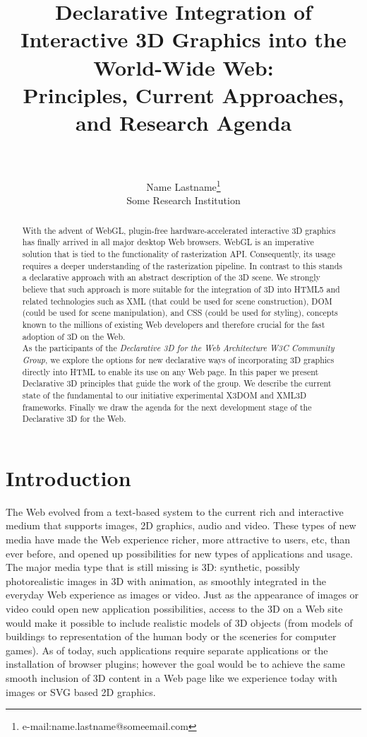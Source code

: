 \documentclass[review]{acmsiggraph}
\title{Declarative Integration of Interactive 3D Graphics into the World-Wide Web:\\Principles, Current Approaches, and Research Agenda
\\~} %
\author{Name Lastname\thanks{e-mail:name.lastname@someemail.com}\\Some Research Institution}
\begin{document}
\maketitle

\begin{abstract}
With the advent of WebGL, plugin-free hardware-accelerated interactive 3D graphics has finally arrived in all major desktop Web browsers.
WebGL is an imperative solution that is tied to the functionality of rasterization API. Consequently, its usage requires a deeper understanding of the rasterization pipeline. In contrast to this stands a declarative approach with an abstract description of the 3D scene. We strongly believe that such approach is more suitable for the integration of 3D into HTML5 and related technologies such as XML (that could be used for scene construction), DOM (could be used for scene manipulation), and CSS (could be used for styling), concepts known to the millions of existing Web developers and therefore crucial for the fast adoption of 3D on the Web.\\
As the participants of the \textit{Declarative 3D for the Web Architecture W3C Community Group}, we explore the options for new declarative ways of incorporating 3D graphics directly into HTML to enable its use on any Web page. In this paper we present Declarative 3D principles that guide the work of the group. We describe the current state of the fundamental to our initiative experimental X3DOM and XML3D frameworks. Finally we draw the agenda for the next development stage of the Declarative 3D for the Web.
\end{abstract}

\begin{CRcatlist}
\end{CRcatlist}

\keywordlist
\copyrightspace

\section{Introduction}

The Web evolved from a text-based system to the current rich and interactive medium that supports images, 2D graphics, audio and video. These types of new media have made the Web experience richer, more attractive to users, etc, than ever before, and opened up possibilities for new types of applications and usage. The major media type that is still missing is 3D: synthetic, possibly photorealistic images in 3D with animation, as smoothly integrated in the everyday Web experience as images or video. Just as the appearance of images or video could open new application possibilities, access to the 3D on a Web site would make it possible to include realistic models of 3D objects (from models of buildings to representation of the human body or the sceneries for computer games). As of today, such applications require separate applications or the installation of browser plugins; however the goal would be to achieve the same smooth inclusion of 3D content in a Web page like we experience today with images or SVG based 2D graphics.
\end{document}
